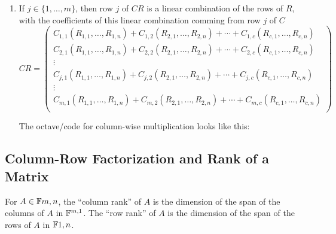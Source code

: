 \begin{thm}
\begin{enumerate}
    \item If $j\in \{1, \ldots, m\}$, then row $j$ of $CR$ is a linear combination of the rows of $R$, with the coefficients of this linear combination comming from row $j$ of $C$
    \begin{equation}
      CR = 
      \left(
        \begin{matrix}
          C_{1,1} (R_{1,1}, \ldots, R_{1,n}) + C_{1,2} (R_{2,1}, \ldots, R_{2,n}) + \cdots + C_{1,c} (R_{c,1}, \ldots, R_{c,n}) \\
          C_{2,1} (R_{1,1}, \ldots, R_{1,n}) + C_{2,2} (R_{2,1}, \ldots, R_{2,n}) + \cdots + C_{2,c} (R_{c,1}, \ldots, R_{c,n}) \\
          \vdots \\
          C_{j,1} (R_{1,1}, \ldots, R_{1,n}) + C_{j,2} (R_{2,1}, \ldots, R_{2,n}) + \cdots + C_{j,c} (R_{c,1}, \ldots, R_{c,n}) \\
          \vdots \\
          C_{m,1} (R_{1,1}, \ldots, R_{1,n}) + C_{m,2} (R_{2,1}, \ldots, R_{2,n}) + \cdots + C_{m,c} (R_{c,1}, \ldots, R_{c,n}) \\
        \end{matrix}
      \right)
    \end{equation}
    

    The octave\-/code for column-wise multiplication looks like this:
    
    \begin{center}
      \begin{minipage}{\linewidth}
        \addtolength{\linewidth}{-7em} 
        
        \addtolength{\linewidth}{+7em}
      \end{minipage}
    \end{center}
  \end{enumerate}
\end{thm}

\subsection{Column-Row Factorization and Rank of a Matrix}

\setcounter{thm}{51}
\begin{mydef}
  For $A \in \mathbb{F}{m,n}$, the ``column rank'' of $A$ is the dimension of the span of the columns of $A$ in $\mathbb{F}^{m,1}$. The ``row rank'' of $A$ is the dimension of the span of the rows of $A$ in $\mathbb{F}{1,n}$.
\end{mydef}

